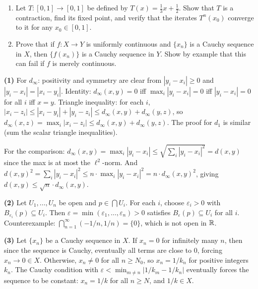 \documentclass{report}
\begin{document}
{\begin{enumerate}[(1)]
    \item Let \(T : [0, 1] \to [0, 1]\) be defined by \(T(x) = \frac{1}{3}x + \frac{1}{2}\). Show that \(T\) is a contraction, find its fixed point, and verify that the iterates \(T^n(x_0)\) converge to it for any \(x_0 \in [0, 1]\).
    
    \item Prove that if \(f : X \to Y\) is uniformly continuous and \(\{x_n\}\) is a Cauchy sequence in \(X\), then \(\{f(x_n)\}\) is a Cauchy sequence in \(Y\). Show by example that this can fail if \(f\) is merely continuous.
\end{enumerate}
}

\begin{solution}
\textbf{(1)} For \(d_\infty\): positivity and symmetry are clear from \(|y_i - x_i| \geq 0\) and \(|y_i - x_i| = |x_i - y_i|\). Identity: \(d_\infty(x, y) = 0\) iff \(\max_i |y_i - x_i| = 0\) iff \(|y_i - x_i| = 0\) for all \(i\) iff \(x = y\). Triangle inequality: for each \(i\), \(|x_i - z_i| \leq |x_i - y_i| + |y_i - z_i| \leq d_\infty(x, y) + d_\infty(y, z)\), so \(d_\infty(x, z) = \max_i |x_i - z_i| \leq d_\infty(x, y) + d_\infty(y, z)\). The proof for \(d_1\) is similar (sum the scalar triangle inequalities).

For the comparison: \(d_\infty(x, y) = \max_i |y_i - x_i| \leq \sqrt{\sum_i |y_i - x_i|^2} = d(x, y)\) since the max is at most the \(\ell^2\)-norm. And \(d(x, y)^2 = \sum_i |y_i - x_i|^2 \leq n \cdot \max_i |y_i - x_i|^2 = n \cdot d_\infty(x, y)^2\), giving \(d(x, y) \leq \sqrt{n} \cdot d_\infty(x, y)\).

\textbf{(2)} Let \(U_1, \ldots, U_n\) be open and \(p \in \bigcap U_i\). For each \(i\), choose \(\varepsilon_i > 0\) with \(B_{\varepsilon_i}(p) \subseteq U_i\). Then \(\varepsilon = \min(\varepsilon_1, \ldots, \varepsilon_n) > 0\) satisfies \(B_\varepsilon(p) \subseteq U_i\) for all \(i\). Counterexample: \(\bigcap_{n=1}^\infty (-1/n, 1/n) = \{0\}\), which is not open in \(\RR\).

\textbf{(3)} Let \(\{x_n\}\) be a Cauchy sequence in \(X\). If \(x_n = 0\) for infinitely many \(n\), then since the sequence is Cauchy, eventually all terms are close to 0, forcing \(x_n \to 0 \in X\). Otherwise, \(x_n \neq 0\) for all \(n \geq N_0\), so \(x_n = 1/k_n\) for positive integers \(k_n\). The Cauchy condition with \(\varepsilon < \min_{m \neq n} |1/k_m - 1/k_n|\) eventually forces the sequence to be constant: \(x_n = 1/k\) for all \(n \geq N\), and \(1/k \in X\).


\end{solution}
\end{document}
